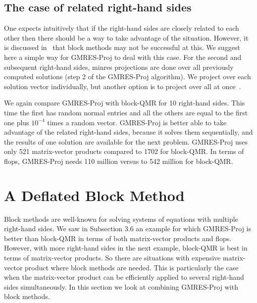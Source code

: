 \documentclass[final]{siamltex}
\begin{document}
\subsection{The case of related right-hand sides}

One expects intuitively that if the right-hand sides are closely related to each other then there should be a way to take advantage of the situation.  However, it is discussed in~\cite{bgdr} that block methods may not be successful at this.  We suggest here a simple way for GMRES-Proj to deal with this case.  For the second and subsequent right-hand sides, minres projections are done over all previously computed solutions (step 2 of the GMRES-Proj algorithm).  We project over each solution vector individually, but another option is to project over all at once~\cite{Fi98}.  

We again compare GMRES-Proj with block-QMR for 10 right-hand sides.  This time the first has random normal entries and all the others are equal to the first one plus $10^{-4}$ times a random vector.  GMRES-Proj is better able to take advantage of the related right-hand sides, because it solves them sequentially, and the results of one solution are available for the next problem.  GMRES-Proj uses only 521 matrix-vector products compared to 1702 for block-QMR.  In terms of flops, GMRES-Proj needs 110 million versus to 542 million for block-QMR.  

\section{A Deflated Block Method}

Block methods are well-known for solving systems of equations with multiple right-hand sides.  We saw in Subsection 3.6 an example for which GMRES-Proj is better than block-QMR in terms of both matrix-vector products and flops.  However, with more right-hand sides in the next example, block-QMR is best in terms of matrix-vector products.  So there are situations with expensive matrix-vector product where block methods are needed.  This is particularly the case when the matrix-vector product can be efficiently applied to several right-hand sides simultaneously.  In this section we look at combining GMRES-Proj with block methods. 
\end{document}
